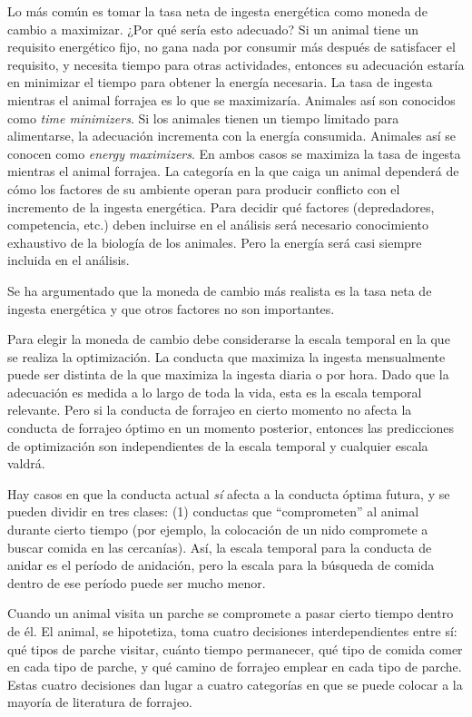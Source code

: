 \documentclass[a4paper,12pt]{article}
\begin{document}
Lo más común es tomar la tasa neta de ingesta energética como moneda de cambio a maximizar. ¿Por qué sería esto adecuado? Si un animal tiene un requisito energético fijo, no gana nada por consumir más después de satisfacer el requisito, y necesita tiempo para otras actividades, entonces su adecuación estaría en minimizar el tiempo para obtener la energía necesaria. La tasa de ingesta mientras el animal forrajea es lo que se maximizaría. Animales así son conocidos como {\itshape time minimizers}. Si los animales tienen un tiempo limitado para alimentarse, la adecuación incrementa con la energía consumida. Animales así se conocen como {\itshape energy maximizers}. En ambos casos se maximiza la tasa de ingesta mientras el animal forrajea. La categoría en la que caiga un animal dependerá de cómo los factores de su ambiente operan para producir conflicto con el incremento de la ingesta energética. Para decidir qué factores (depredadores, competencia, etc.) deben incluirse en el análisis será necesario conocimiento exhaustivo de la biología de los animales. Pero la energía será casi siempre incluida en el análisis.

Se ha argumentado que la moneda de cambio más realista es la tasa neta de ingesta energética y que otros factores no son importantes.

Para elegir la moneda de cambio debe considerarse la escala temporal en la que se realiza la optimización. La conducta que maximiza la ingesta mensualmente puede ser distinta de la que maximiza la ingesta diaria o por hora. Dado que la adecuación es medida a lo largo de toda la vida, esta es la escala temporal relevante. Pero si la conducta de forrajeo en cierto momento no afecta la conducta de forrajeo óptimo en un momento posterior, entonces las predicciones de optimización son independientes de la escala temporal y cualquier escala valdrá.

Hay casos en que la conducta actual {\itshape sí} afecta a la conducta óptima futura, y se pueden dividir en tres clases: (1) conductas que ``comprometen'' al animal durante cierto tiempo (por ejemplo, la colocación de un nido compromete a buscar comida en las cercanías). Así, la escala temporal para la conducta de anidar es el período de anidación, pero la escala para la búsqueda de comida dentro de ese período puede ser mucho menor.

Cuando un animal visita un parche se compromete a pasar cierto tiempo dentro de él. El animal, se hipotetiza, toma cuatro decisiones interdependientes entre sí: qué tipos de parche visitar, cuánto tiempo permanecer, qué tipo de comida comer en cada tipo de parche, y qué camino de forrajeo emplear en cada tipo de parche. Estas cuatro decisiones dan lugar a cuatro categorías en que se puede colocar a la mayoría de literatura de forrajeo.
\end{document}
